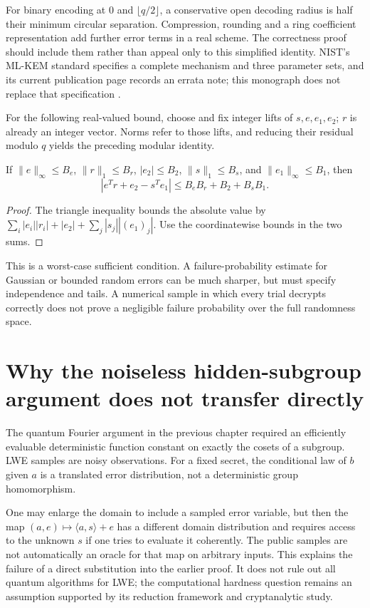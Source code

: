 For binary encoding at $0$ and $\lfloor q/2\rfloor$, a conservative open decoding radius is half their minimum circular separation. Compression, rounding and a ring coefficient representation add further error terms in a real scheme. The correctness proof should include them rather than appeal only to this simplified identity. NIST's ML-KEM standard specifies a complete mechanism and three parameter sets, and its current publication page records an errata note; this monograph does not replace that specification \cite{NIST203}.

For the following real-valued bound, choose and fix integer lifts of $s,e,e_1,e_2$; $r$ is already an integer vector. Norms refer to those lifts, and reducing their residual modulo $q$ yields the preceding modular identity.

\begin{proposition}
If $\|e\|_\infty\le B_e$, $\|r\|_1\le B_r$, $|e_2|\le B_2$,
$\|s\|_1\le B_s$, and $\|e_1\|_\infty\le B_1$, then
\[
 |e^Tr+e_2-s^Te_1|\le B_eB_r+B_2+B_sB_1.
\]
\end{proposition}
\begin{proof}
The triangle inequality bounds the absolute value by
$\sum_i|e_i||r_i|+|e_2|+\sum_j|s_j||(e_1)_j|$.
Use the coordinatewise bounds in the two sums.
\end{proof}

This is a worst-case sufficient condition. A failure-probability estimate for Gaussian or bounded random errors can be much sharper, but must specify independence and tails. A numerical sample in which every trial decrypts correctly does not prove a negligible failure probability over the full randomness space.

\section{Why the noiseless hidden-subgroup argument does not transfer directly}
The quantum Fourier argument in the previous chapter required an efficiently evaluable deterministic function constant on exactly the cosets of a subgroup. LWE samples are noisy observations. For a fixed secret, the conditional law of $b$ given $a$ is a translated error distribution, not a deterministic group homomorphism.

One may enlarge the domain to include a sampled error variable, but then the map
$(a,e)\mapsto\langle a,s\rangle+e$ has a different domain distribution and requires access to the unknown $s$ if one tries to evaluate it coherently. The public samples are not automatically an oracle for that map on arbitrary inputs. This explains the failure of a direct substitution into the earlier proof. It does not rule out all quantum algorithms for LWE; the computational hardness question remains an assumption supported by its reduction framework and cryptanalytic study.

